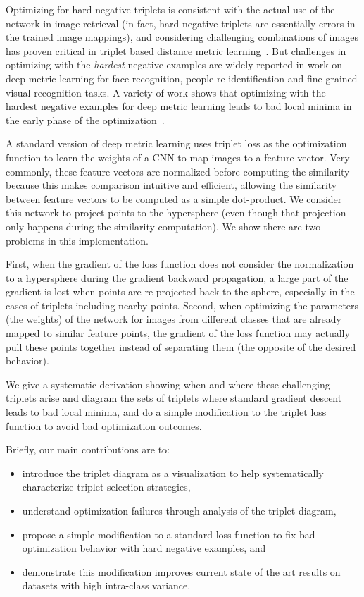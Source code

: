 \documentclass[runningheads]{llncs}
\begin{document}
Optimizing for hard negative triplets is consistent with the actual use of the network in image retrieval (in fact, hard negative triplets are essentially errors in the trained image mappings), and considering challenging combinations of images has proven critical in triplet based distance metric learning~\cite{HTL,harwood2017smart,HermansBeyer2017Arxiv,facenet,Suh_2019_CVPR}. But challenges in optimizing with the \textit{hardest} negative examples are widely reported in work on deep metric learning for face recognition, people re-identification and fine-grained visual recognition tasks. A variety of work shows that optimizing with the hardest negative examples for deep metric learning leads to bad local minima in the early phase of the optimization~\cite{xuan2019improved,faghri2018vse++,facenet,wang2017train,yu2018correcting,SOP,ge2019visual}.

A standard version of deep metric learning uses triplet loss as the optimization function to learn the weights of a CNN to map images to a feature vector.  Very commonly, these feature vectors are normalized before computing the similarity because this makes comparison intuitive and efficient, allowing the similarity between feature vectors to be computed as a simple dot-product.  We consider this network to project points to the hypersphere (even though that projection only happens during the similarity computation).  We show there are two problems in this implementation.

First, when the gradient of the loss function does not consider the normalization to a hypersphere during the gradient backward propagation, a large part of the gradient is lost when points are re-projected back to the sphere, especially in the cases of triplets including nearby points. Second, when optimizing the parameters (the weights) of the network for images from different classes that are already mapped to similar feature points, the gradient of the loss function may actually pull these points together instead of separating them (the opposite of the desired behavior).

We give a systematic derivation showing when and where these challenging triplets arise and diagram the sets of triplets where standard gradient descent leads to bad local minima, and do a simple modification to the triplet loss function to avoid bad optimization outcomes. 

Briefly, our main contributions are to:
\begin{itemize}
    \item introduce the triplet diagram as a visualization to help systematically characterize triplet selection strategies,
    \item understand optimization failures through analysis of the triplet diagram,
    \item propose a simple modification to a standard loss function to fix bad optimization behavior with hard negative examples, and
    \item demonstrate this modification improves current state of the art results on datasets with high intra-class variance.
\end{itemize}
\end{document}
